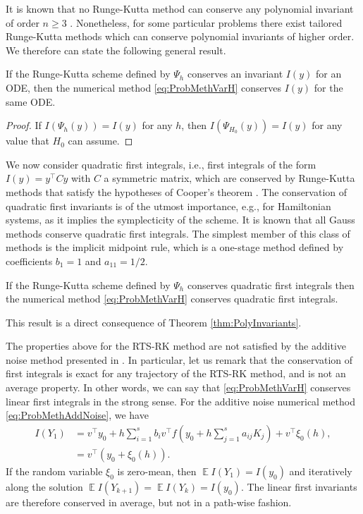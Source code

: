 \documentclass{siamart1116}
\numberwithin{theorem}{section}
\newcommand{\E}{\operatorname{\mathbb{E}}}
\newcommand{\sksum}{{\textstyle\sum}}
\begin{document}
It is known that no Runge-Kutta method can conserve any polynomial invariant of order $n \geq 3$ \cite{HLW06}. Nonetheless, for some particular problems there exist tailored Runge-Kutta methods which can conserve polynomial invariants of higher order. We therefore can state the following general result.
\begin{theorem}\label{thm:PolyInvariants} If the Runge-Kutta scheme defined by $\Psi_h$ conserves an invariant $I(y)$ for an ODE, then the numerical method \eqref{eq:ProbMethVarH} conserves $I(y)$ for the same ODE.
\end{theorem}
\begin{proof} If $I(\Psi_h(y)) = I(y)$ for any $h$, then $I(\Psi_{H_0}(y)) = I(y)$ for any value that $H_0$ can assume.
\end{proof}

We now consider quadratic first integrals, i.e., first integrals of the form $I(y) = y^\top C y$ with $C$ a symmetric matrix, which are conserved by Runge-Kutta methods that satisfy the hypotheses of Cooper's theorem \cite{HLW06}. The conservation of quadratic first invariants is of the utmost importance, e.g., for Hamiltonian systems, as it implies the symplecticity of the scheme. It is known \cite{HLW06} that all Gauss methods conserve quadratic first integrals. The simplest member of this class of methods is the implicit midpoint rule, which is a one-stage method defined by coefficients $b_1 = 1$ and $a_{11} = 1/2$.
\begin{corollary}\label{thm:QuadraticInvariants} If the Runge-Kutta scheme defined by $\Psi_h$ conserves quadratic first integrals then the numerical method \eqref{eq:ProbMethVarH} conserves quadratic first integrals.
\end{corollary}
This result is a direct consequence of Theorem \ref{thm:PolyInvariants}.

The properties above for the RTS-RK method are not satisfied by the additive noise method presented in \cite{CGS16}. In particular, let us remark that the conservation of first integrals is exact for any trajectory of the RTS-RK method, and is not an average property. In other words, we can say that \eqref{eq:ProbMethVarH} conserves linear first integrals in the strong sense. For the additive noise numerical method \eqref{eq:ProbMethAddNoise}, we have
\begin{equation}
	\begin{aligned}
	I(Y_1) &= v^\top  y_0 + h \sksum_{i=1}^s b_iv^\top  f(y_0 + h\sksum_{j=1}^{s} a_{ij}K_j) + v^\top  \xi_0(h), \\
	&= v^\top  (y_0 + \xi_0(h)).
	\end{aligned}
\end{equation}
If the random variable $\xi_0$ is zero-mean, then $\E I(Y_1) = I(y_0)$ and iteratively along the solution $\E I(Y_{k+1}) = \E I(Y_k) = I(y_0)$. The linear first invariants are therefore conserved in average, but not in a path-wise fashion.
\end{document}
